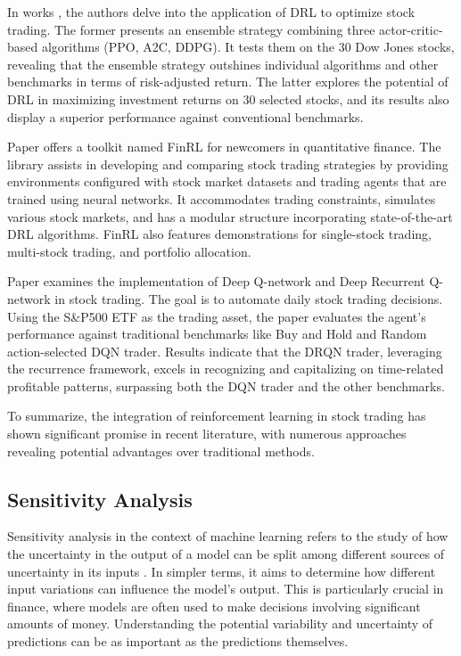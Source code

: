 \documentclass[12pt]{article}
\begin{document}
In works \cite{EnsembleStategy}, \cite{practicalDRL} the authors delve into the application of DRL to optimize stock trading. The former presents an ensemble strategy combining three actor-critic-based algorithms (PPO, A2C, DDPG). It tests them on the 30 Dow Jones stocks, revealing that the ensemble strategy outshines individual algorithms and other benchmarks in terms of risk-adjusted return. The latter explores the potential of DRL in maximizing investment returns on 30 selected stocks, and its results also display a superior performance against conventional benchmarks.

Paper \cite{liu2020finrl} offers a toolkit named FinRL for newcomers in quantitative finance. The library assists in developing and comparing stock trading strategies by providing environments configured with stock market datasets and trading agents that are trained using neural networks. It accommodates trading constraints, simulates various stock markets, and has a modular structure incorporating state-of-the-art DRL algorithms. FinRL also features demonstrations for single-stock trading, multi-stock trading, and portfolio allocation.

Paper \cite{AutoStockTrain} examines the implementation of Deep Q-network and Deep Recurrent Q-network in stock trading. The goal is to automate daily stock trading decisions. Using the S\&P500 ETF as the trading asset, the paper evaluates the agent's performance against traditional benchmarks like Buy and Hold  and Random action-selected DQN trader. Results indicate that the DRQN trader, leveraging the recurrence framework, excels in recognizing and capitalizing on time-related profitable patterns, surpassing both the DQN trader and the other benchmarks.

To summarize, the integration of reinforcement learning in stock trading has shown significant promise in recent literature, with numerous approaches revealing potential advantages over traditional methods.

\subsection{Sensitivity Analysis} %
\label{subsec:sensitivity} 

Sensitivity analysis in the context of machine learning refers to the study of how the uncertainty in the output of a model can be split among different sources of uncertainty in its inputs \cite{GlobalSensitivityOverview}. In simpler terms, it aims to determine how different input variations can influence the model's output. This is particularly crucial in finance, where models are often used to make decisions involving significant amounts of money. Understanding the potential variability and uncertainty of predictions can be as important as the predictions themselves.
\end{document}
